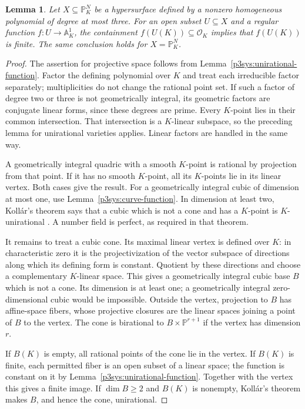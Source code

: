 \documentclass[11pt]{article}
\newtheorem{lemma}[theorem]{Lemma}
\theoremstyle{definition}
\begin{document}
\begin{lemma}\label{p3sys:cubic-function}
Let $X\subseteq\mathbb P^N_K$ be a hypersurface defined by a
nonzero homogeneous polynomial of degree at most three.  For an open
subset $U\subseteq X$ and a regular function
$f:U\to\mathbb A^1_K$, the containment
$f(U(K))\subseteq\mathcal O_K$ implies that $f(U(K))$ is finite.
The same conclusion holds for $X=\mathbb P^N_K$.
\end{lemma}
\begin{proof}
The assertion for projective space follows from
Lemma~\ref{p3sys:unirational-function}.  Factor the defining
polynomial over $K$ and treat each irreducible factor separately;
multiplicities do not change the rational point set.  If such a
factor of degree two or three is not geometrically integral, its
geometric factors are conjugate linear forms, since these degrees
are prime.  Every $K$-point lies in their common intersection.
That intersection is a $K$-linear subspace, so the preceding lemma
for unirational varieties applies.  Linear factors are handled in
the same way.

A geometrically integral quadric with a smooth $K$-point is rational
by projection from that point.  If it has no smooth $K$-point, all
its $K$-points lie in its linear vertex.  Both cases give the result.
For a geometrically integral cubic of dimension at most one, use
Lemma~\ref{p3sys:curve-function}.  In dimension at least two,
Koll\'ar's theorem says that a cubic which is not a cone and has
a $K$-point is $K$-unirational
\cite[Theorem~2]{lbKollar2002}.  A number field is perfect,
as required in that theorem.

It remains to treat a cubic cone.  Its maximal linear vertex is
defined over $K$: in characteristic zero it is the projectivization
of the vector subspace of directions along which its defining form
is constant.  Quotient by these directions and choose a complementary
$K$-linear space.  This gives a geometrically integral cubic base
$B$ which is not a cone.  Its dimension is at least one; a
geometrically integral zero-dimensional cubic would be impossible.
Outside the vertex, projection to $B$ has affine-space fibers, whose
projective closures are the linear spaces joining a point of $B$
to the vertex.  The cone is birational to
$B\times\mathbb P^{r+1}$ if the vertex has dimension $r$.

If $B(K)$ is empty, all rational points of the cone lie in the
vertex.  If $B(K)$ is finite, each permitted fiber is an open
subset of a linear space; the function is constant on it by
Lemma~\ref{p3sys:unirational-function}.  Together with the vertex
this gives a finite image.  If $\dim B\ge2$ and $B(K)$ is
nonempty, Koll\'ar's theorem makes $B$, and hence the cone,
unirational.


\end{proof}
\end{document}
